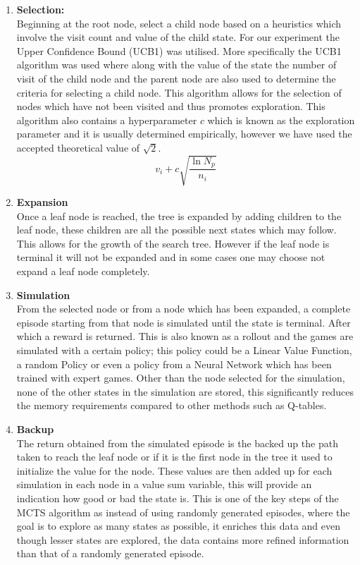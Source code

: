 \documentclass[a4paper,12pt,table]{article}
\begin{document}
\begin{enumerate}
    \item \textbf{Selection:} \\
    Beginning at the root node, select a child node based on a heuristics which involve the visit count and value of the child state. For our experiment the Upper Confidence Bound (UCB1) was utilised. More specifically the UCB1 algorithm was used where along with the value of the state the number of visit of the child node and the parent node are also used to determine the criteria for selecting a child node. This algorithm allows for the selection of nodes which have not been visited and thus promotes exploration. This algorithm also contains a hyperparameter $c$ which is known as the exploration parameter and it is usually determined empirically, however we have used the accepted theoretical value of $\sqrt{2}$.
    \[v_i + c\sqrt{\frac{\ln{N_p}}{n_i}}  \]
    
    \item \textbf{Expansion} \\
    Once a leaf node is reached, the tree is expanded by adding children to the leaf node, these children are all the possible next states which may follow. This allows for the growth of the search tree. However if the leaf node is terminal it will not be expanded and in some cases one may choose not expand a leaf node completely.
    
    \item \textbf{Simulation} \\
    From the selected node or from a node which has been expanded, a complete episode starting from that node is simulated until the state is terminal. After which a reward is returned. This is also known as a rollout and the games are simulated with a certain policy; this policy could be a Linear Value Function, a random Policy or even a policy from a Neural Network which has been trained with expert games. Other than the node selected for the simulation, none of the other states in the simulation are stored, this significantly reduces the memory requirements compared to other methods such as Q-tables.
    
    \item \textbf{Backup} \\
    The return obtained from the simulated episode is the backed up the path taken to reach the leaf node or if it is the first node in the tree it used to initialize the value for the node. These values are then added up for each simulation in each node in a value sum variable, this will provide an indication how good or bad the state is. This is one of the key steps of the MCTS algorithm as instead of using randomly generated episodes, where the goal is to explore as many states as possible, it enriches this data and even though lesser states are explored, the data contains more refined information than that of a randomly generated episode.
\end{enumerate}
\end{document}
